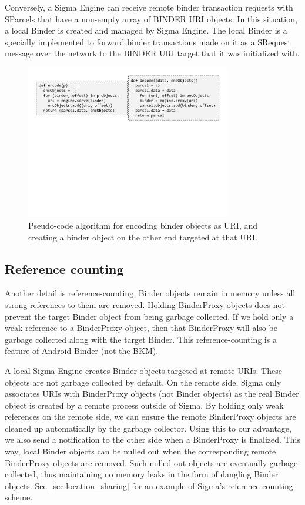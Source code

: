 \documentclass[prodmode]{acmlarge}
\begin{document}
Conversely, a Sigma Engine can receive remote binder transaction requests with SParcels that have a non-empty array of BINDER URI objects. In this situation, a local Binder is created and managed by Sigma Engine. The local Binder is a specially implemented to forward binder transactions made on it as a SRequest message over the network to the BINDER URI target that it was initialized with.


\begin{figure}[h]
\centering
\includegraphics[width=0.8\textwidth]{drawings/encodeObjects.pdf}
\caption{Pseudo-code algorithm for encoding binder objects as URI, and creating a binder object on the other end targeted at that URI.}
\end{figure}

\subsection{Reference counting}
Another detail is reference-counting. Binder objects remain in memory unless all strong references to them are removed. Holding BinderProxy objects does not prevent the target Binder object from being garbage collected. If we hold only a weak reference to a BinderProxy object, then that BinderProxy will also be garbage collected along with the target Binder. This reference-counting is a feature of Android Binder (not the BKM).

A local Sigma Engine creates Binder objects targeted at remote URIs. These objects are not garbage collected by default. On the remote side, Sigma only associates URIs with BinderProxy objects (not Binder objects) as the real Binder object is created by a remote process outside of Sigma. By holding only weak references on the remote side, we can ensure the remote BinderProxy objects are cleaned up automatically by the garbage collector. Using this to our advantage, we also send a notification to the other side when a BinderProxy is finalized. This way, local Binder objects can be nulled out when the corresponding remote BinderProxy objects are removed. Such nulled out objects are eventually garbage collected, thus maintaining no memory leaks in the form of dangling Binder objects. See~\ref{sec:location_sharing} for an example of Sigma's reference-counting scheme.
\end{document}
